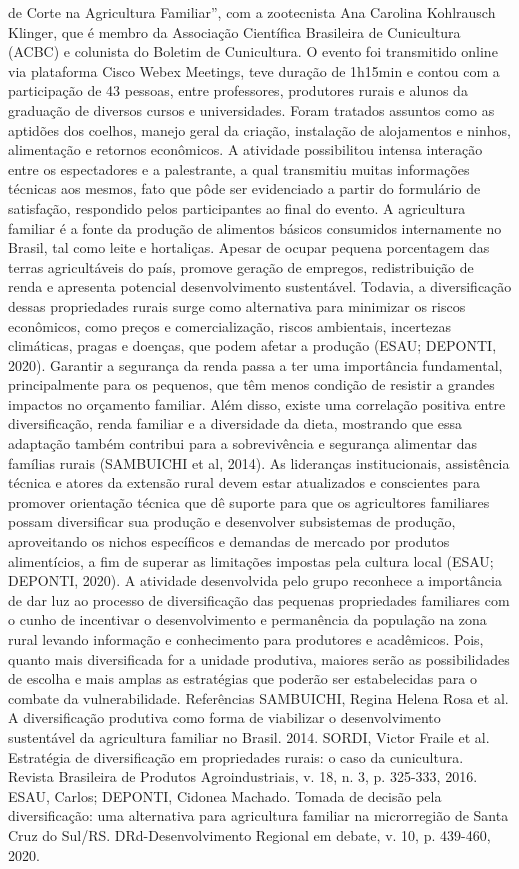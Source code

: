 de Corte na Agricultura Familiar”, com a zootecnista Ana Carolina Kohlrausch Klinger, que é
membro da Associação Científica Brasileira de Cunicultura (ACBC) e colunista do Boletim de
Cunicultura. O evento foi transmitido online via plataforma Cisco Webex Meetings, teve duração
de 1h15min e contou com a participação de 43 pessoas, entre professores, produtores rurais e
alunos da graduação de diversos cursos e universidades. Foram tratados assuntos como as
aptidões dos coelhos, manejo geral da criação, instalação de alojamentos e ninhos, alimentação e
retornos econômicos. A atividade possibilitou intensa interação entre os espectadores e a
palestrante, a qual transmitiu muitas informações técnicas aos mesmos, fato que pôde ser
evidenciado a partir do formulário de satisfação, respondido pelos participantes ao final do
evento.
A agricultura familiar é a fonte da produção de alimentos básicos consumidos
internamente no Brasil, tal como leite e hortaliças. Apesar de ocupar pequena porcentagem das
terras agricultáveis do país, promove geração de empregos, redistribuição de renda e apresenta
potencial desenvolvimento sustentável. Todavia, a diversificação dessas propriedades rurais
surge como alternativa para minimizar os riscos econômicos, como preços e comercialização,
riscos ambientais, incertezas climáticas, pragas e doenças, que podem afetar a produção (ESAU;
DEPONTI, 2020).
Garantir a segurança da renda passa a ter uma importância fundamental, principalmente
para os pequenos, que têm menos condição de resistir a grandes impactos no orçamento familiar.
Além disso, existe uma correlação positiva entre diversificação, renda familiar e a diversidade da
dieta, mostrando que essa adaptação também contribui para a sobrevivência e segurança
alimentar das famílias rurais (SAMBUICHI et al, 2014).
As lideranças institucionais, assistência técnica e atores da extensão rural devem estar
atualizados e conscientes para promover orientação técnica que dê suporte para que os
agricultores familiares possam diversificar sua produção e desenvolver subsistemas de produção,
aproveitando os nichos específicos e demandas de mercado por produtos alimentícios, a fim de
superar as limitações impostas pela cultura local (ESAU; DEPONTI, 2020).
A atividade desenvolvida pelo grupo reconhece a importância de dar luz ao processo de
diversificação das pequenas propriedades familiares com o cunho de incentivar o
desenvolvimento e permanência da população na zona rural levando informação e conhecimento
para produtores e acadêmicos. Pois, quanto mais diversificada for a unidade produtiva, maiores
serão as possibilidades de escolha e mais amplas as estratégias que poderão ser estabelecidas
para o combate da vulnerabilidade.
Referências
SAMBUICHI, Regina Helena Rosa et al. A diversificação produtiva como forma de viabilizar o
desenvolvimento sustentável da agricultura familiar no Brasil. 2014.
SORDI, Victor Fraile et al. Estratégia de diversificação em propriedades rurais: o caso da
cunicultura. Revista Brasileira de Produtos Agroindustriais, v. 18, n. 3, p. 325-333, 2016.
ESAU, Carlos; DEPONTI, Cidonea Machado. Tomada de decisão pela diversificação: uma
alternativa para agricultura familiar na microrregião de Santa Cruz do Sul/RS.
DRd-Desenvolvimento Regional em debate, v. 10, p. 439-460, 2020.

